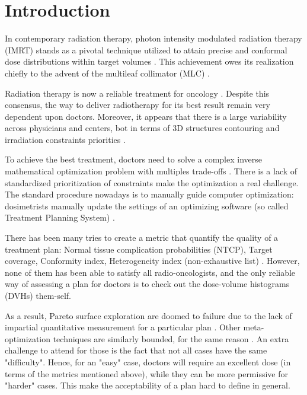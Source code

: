 \section{Introduction}
In contemporary radiation therapy, photon intensity modulated radiation therapy (IMRT) stands as a pivotal technique utilized to attain precise and conformal dose distributions within target volumes \cite{xu_comparison_2017}.
This achievement owes its realization chiefly to the advent of the multileaf collimator (MLC) \cite{galvin_characterization_1993}.

Radiation therapy is now a reliable treatment for oncology \cite{valentini_survival_2009}.
Despite this consensus, the way to deliver radiotherapy for its best result remain very dependent upon doctors.
Moreover, it appears that there is a large variability across physicians and centers, bot in terms of 3D structures contouring and irradiation constraints priorities \cite{variability_2021}.

To achieve the best treatment, doctors need to solve a complex inverse mathematical optimization problem with multiples trade-offs \cite{oelfke_inverse_2001} \cite{webb_physical_2003}.
There is a lack of standardized prioritization of constraints make the optimization a real challenge.
The standard procedure nowadays is to manually guide computer optimization: dosimetrists manually update the settings of an optimizing software (so called Treatment Planning System) \cite{planification_website}.

There has been many tries to create a metric that quantify the quality of a treatment plan: Normal tissue complication probabilities (NTCP), Target coverage, Conformity index, Heterogeneity index (non-exhaustive list) \cite{lyman_normal_1992} \cite{li_input_2022}.\label{metrics}
However, none of them has been able to satisfy all radio-oncologists, and the only reliable way of assessing a plan for doctors is to check out the dose-volume histograms (DVHs) them-self.

As a result, Pareto surface exploration are doomed to failure due to the lack of impartial quantitative measurement for a particular plan \cite{huang_pareto_2021}.
Other meta-optimization techniques are similarly bounded, for the same reason \cite{wu_optimization_2001} \cite{xing_optimization_1999}.
An extra challenge to attend for those is the fact that not all cases have the same "difficulty".
Hence, for an "easy" case, doctors will require an excellent dose (in terms of the metrics mentioned above), while they can be more permissive for "harder" cases.
This make the acceptability of a plan hard to define in general.

